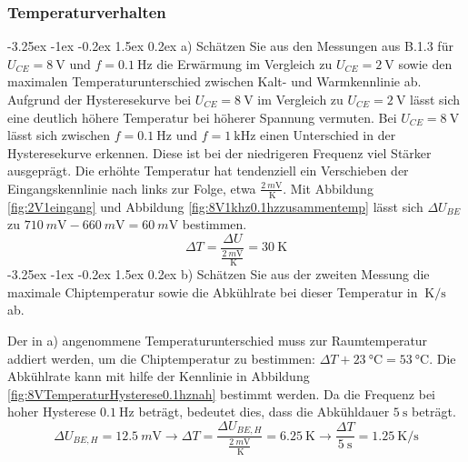 \documentclass[
	a4paper, %
	12pt, %
]{CSUniSchoolLabReport}
\makeatletter
\renewcommand\paragraph{\@startsection{paragraph}{4}{\z@}%
  {-3.25ex \@plus -1ex \@minus -0.2ex}%
  {1.5ex \@plus 0.2ex}%
  {\normalfont\normalsize\bfseries}}
\newcommand{\milli}{m}
\makeatother
\begin{document}
\subsubsection{Temperaturverhalten}
\paragraph{a) Schätzen Sie aus den Messungen aus B.1.3 für $U_{CE} = \SI{8}{\volt}$ und $f = \SI{0.1}{\hertz}$ die Erwärmung im Vergleich zu $U_{CE} = \SI{2}{\volt}$ sowie den maximalen Temperaturunterschied zwischen Kalt- und Warmkennlinie ab.}
Aufgrund der Hysteresekurve bei $U_{CE} = \SI{8}{\volt}$ im Vergleich zu $U_{CE} = \SI{2}{\volt}$ lässt sich eine deutlich höhere Temperatur bei höherer Spannung vermuten. 
Bei $U_{CE} = \SI{8}{\volt}$ lässt sich zwischen $f = \SI{0.1}{\hertz}$ und $f = \SI{1}{\kilo\hertz}$ einen Unterschied in der Hysteresekurve erkennen. Diese ist bei der niedrigeren Frequenz viel Stärker ausgeprägt.  
Die erhöhte Temperatur hat tendenziell ein Verschieben der Eingangskennlinie nach links zur Folge, etwa $\frac{\SI{2}{\milli\volt}}{\SI{}{\kelvin}}$. 
Mit Abbildung \ref{fig:2V1eingang} und Abbildung \ref{fig:8V1khz0.1hzzusammentemp} lässt sich $\Delta U_{BE}$ zu $\SI{710}{\milli\volt} - \SI{660}{\milli\volt} = \SI{60}{\milli\volt}$ bestimmen.
\[
\Delta T = \frac{\Delta U}{\frac{\SI{2}{\milli\volt}}{\SI{}{\kelvin}}} = \SI{30}{\kelvin}
\]
\paragraph{b) Schätzen Sie aus der zweiten Messung die maximale Chiptemperatur sowie die Abkühlrate bei dieser
Temperatur in $\SI{}{\kelvin\per\second}$ ab.}

Der in a) angenommene Temperaturunterschied muss zur Raumtemperatur addiert werden, um die Chiptemperatur zu bestimmen: $\Delta T + \SI{23}{\degreeCelsius} = \SI{53}{\degreeCelsius}$.
Die Abkühlrate kann mit hilfe der Kennlinie in Abbildung \ref{fig:8VTemperaturHysterese0.1hznah} bestimmt werden.
Da die Frequenz bei hoher Hysterese $\SI{0.1}{\hertz}$ beträgt, bedeutet dies, dass die Abkühldauer $\SI{5}{\second}$ beträgt. 
\[
\Delta U_{BE,H} = \SI{12.5}{\milli\volt} \rightarrow \Delta T = \frac{\Delta U_{BE,H}}{\frac{\SI{2}{\milli\volt}}{\SI{}{\kelvin}}} = \SI{6.25}{\kelvin}
\rightarrow \frac{\Delta T}{\SI{5}{\second}} = \SI{1.25}{\kelvin\per\second}
\]
%
\end{document}
